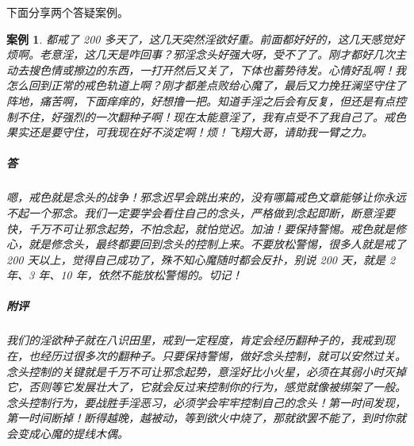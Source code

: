 \documentclass{ctexart}
\newtheorem{case}{案例}
\begin{document}
下面分享两个答疑案例。

\begin{case}
    都戒了 200 多天了，这几天突然淫欲好重。前面都好好的，这几天感觉好烦啊。老意淫，这几天是咋回事？邪淫念头好强大呀，受不了了。刚才都好几次主动去搜色情或擦边的东西，一打开然后又关了，下体也蓄势待发。心情好乱啊！我怎么回到正常的戒色轨道上啊？刚才都差点败给心魔了，最后又力挽狂澜坚守住了阵地，痛苦啊，下面痒痒的，好想撸一把。知道手淫之后会有反复，但还是有点控制不住，好强烈的一次翻种子啊！现在太能意淫了，我有点受不了我自己了。戒色果实还是要守住，可我现在好不淡定啊！烦！飞翔大哥，请助我一臂之力。
    \subparagraph{答} 嗯，戒色就是念头的战争！邪念迟早会跳出来的，没有哪篇戒色文章能够让你永远不起一个邪念。我们一定要学会看住自己的念头，严格做到念起即断，断意淫要快，千万不可让邪念起势，不怕念起，就怕觉迟。加油！要保持警惕。戒色就是修心，就是修念头，最终都要回到念头的控制上来。不要放松警惕，很多人就是戒了 200 天以上，觉得自己成功了，殊不知心魔随时都会反扑，别说 200 天，就是 2 年、3 年、10 年，依然不能放松警惕的。切记！
    \subparagraph{附评} 我们的淫欲种子就在八识田里，戒到一定程度，肯定会经历翻种子的，我戒到现在，也经历过很多次的翻种子。只要保持警惕，做好念头控制，就可以安然过关。念头控制的关键就是千万不可让邪念起势，意淫好比小火星，必须在其弱小时灭掉它，否则等它发展壮大了，它就会反过来控制你的行为，感觉就像被绑架了一般。念头控制行为，要战胜手淫恶习，必须学会牢牢控制自己的念头！第一时间发现，第一时间断掉！断得越晚，越被动，等到欲火中烧了，那就欲罢不能了，到时你就会变成心魔的提线木偶。
\end{case}
\end{document}
